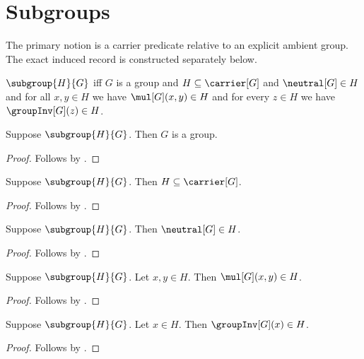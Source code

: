


\section{Subgroups}

The primary notion is a carrier predicate relative to an explicit ambient
group.  The exact induced record is constructed separately below.

\begin{definition}\label{subgroup}
    $\subgroup{H}{G}$ iff
        $G$ is a group and
        $H\subseteq\carrier[G]$ and
        $\neutral[G]\in H$ and
        for all $x,y\in H$ we have $\mul[G](x,y)\in H$ and
        for every $z\in H$ we have $\groupInv[G](z)\in H$.
\end{definition}

\begin{proposition}\label{subgroup_ambient_group}
    Suppose $\subgroup{H}{G}$.
    Then $G$ is a group.
\end{proposition}
\begin{proof}
    Follows by .
\end{proof}

\begin{proposition}\label{subgroup_subseteq}
    Suppose $\subgroup{H}{G}$.
    Then $H\subseteq\carrier[G]$.
\end{proposition}
\begin{proof}
    Follows by .
\end{proof}

\begin{proposition}\label{subgroup_neutral}
    Suppose $\subgroup{H}{G}$.
    Then $\neutral[G]\in H$.
\end{proposition}
\begin{proof}
    Follows by .
\end{proof}

\begin{proposition}\label{subgroup_mul}
    Suppose $\subgroup{H}{G}$.
    Let $x,y\in H$.
    Then $\mul[G](x,y)\in H$.
\end{proposition}
\begin{proof}
    Follows by .
\end{proof}

\begin{proposition}\label{subgroup_inv}
    Suppose $\subgroup{H}{G}$.
    Let $x\in H$.
    Then $\groupInv[G](x)\in H$.
\end{proposition}
\begin{proof}
    Follows by .
\end{proof}

